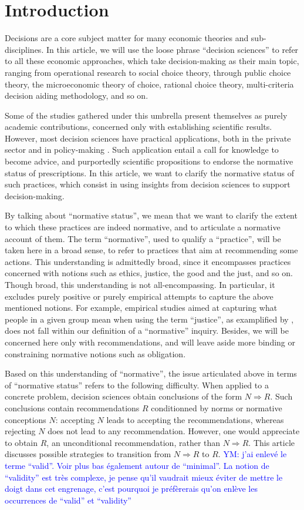 \documentclass[preprint, french, english, 11pt, authoryear]{elsarticle}%
\newcommand{\commentYM}[1]{\textcolor{blue}{YM: #1}}
\begin{document}
\section{Introduction}
Decisions are a core subject matter for many economic theories and sub-disciplines. In this article, we will use the loose phrase ``decision sciences'' to refer to all these economic approaches, which take decision-making as their main topic, ranging from operational research to social choice theory, through public choice theory, the microeconomic theory of choice, rational choice theory, multi-criteria decision aiding methodology, and so on.

Some of the studies gathered under this umbrella present themselves as purely academic contributions, concerned only with establishing scientific results. However, most decision sciences have practical applications, both in the private sector and in policy-making \citet{tsoukias_policy_2013,marchi_evidence-based_2016}. Such application entail a call for knowledge to become advice, and purportedly scientific propositions to endorse the normative status of prescriptions. 
In this article, we want to clarify the normative status of such practices, which consist in using insights from decision sciences to support decision-making.

By talking about ``normative status'', we mean that we want to clarify the extent to which these practices are indeed normative, and to articulate a normative account of them. 
The term ``normative'', used to qualify a “practice”, will be taken here in a broad sense, to refer to practices that aim at recommending some actions. This understanding is admittedly broad, since it encompasses practices concerned with notions such as ethics, justice, the good and the just, and so on. 
Though broad, this understanding is not all-encompassing. In particular, it excludes purely positive or purely empirical attempts to capture the above mentioned notions. For example, empirical studies aimed at capturing what people in a given group mean when using the term ``justice'', as examplified by \citet{gaertner_empirical_2012}, does not fall within our definition of a ``normative'' inquiry. Besides, we will be concerned here only with recommendations, and will leave aside more binding or constraining normative notions such as obligation.

Based on this understanding of ``normative'', the issue articulated above in terms of ``normative status'' refers to the following difficulty. When applied to a concrete problem, decision sciences obtain conclusions of the form $N ⇒ R$. Such conclusions contain recommendations $R$ conditionned by norms or normative conceptions $N$: accepting  $N$ leads to accepting the recommendations, whereas rejecting $N$ does not lead to any recommendation. However, one would appreciate to obtain $R$, an unconditional recommendation, rather than $N ⇒ R$. This article discusses possible strategies to transition from $N ⇒ R$ to $R$.
\commentYM{j'ai enlevé le terme ``valid''. Voir plus bas également autour de ``minimal''. La notion de ``validity'' est très complexe, je pense qu'il vaudrait mieux éviter de mettre le doigt dans cet engrenage, c'est pourquoi je préfèrerais qu'on enlève les occurrences de ``valid'' et ``validity''}
\end{document}
